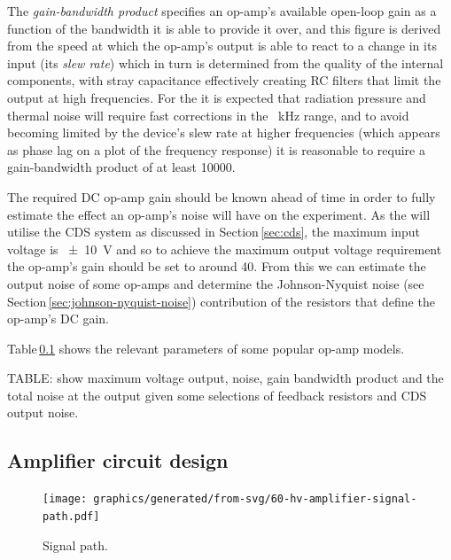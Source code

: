 The \emph{gain-bandwidth product} specifies an op-amp's available open-loop gain as a function of the bandwidth it is able to provide it over, and this figure is derived from the speed at which the op-amp's output is able to react to a change in its input (its \emph{slew rate}) which in turn is determined from the quality of the internal components, with stray capacitance effectively creating \gls{RC} filters that limit the output at high frequencies. For the \SSMEXPT{} it is expected that radiation pressure and thermal noise will require fast corrections in the \SI{}{\kilo\hertz} range, and to avoid becoming limited by the device's slew rate at higher frequencies (which appears as phase lag on a plot of the frequency response) it is reasonable to require a gain-bandwidth product of at least \num{10000}.

The required \gls{DC} op-amp gain should be known ahead of time in order to fully estimate the effect an op-amp's noise will have on the experiment. As the \SSMEXPT{} will utilise the \gls{CDS} system as discussed in Section\,\ref{sec:cds}, the maximum input voltage is \SI{\pm10}{\volt} and so to achieve the maximum output voltage requirement the op-amp's gain should be set to around \num{40}. From this we can estimate the output noise of some op-amps and determine the Johnson-Nyquist noise (see Section\,\ref{sec:johnson-nyquist-noise}) contribution of the resistors that define the op-amp's \gls{DC} gain.

Table\,\ref{} shows the relevant parameters of some popular op-amp models.

TABLE: show maximum voltage output, noise, gain bandwidth product and the total noise at the output given some selections of feedback resistors and CDS output noise.

\subsection{Amplifier circuit design}

\begin{figure}
  \centering
  \texttt{[image: graphics/generated/from-svg/60-hv-amplifier-signal-path.pdf]}
  \caption[High voltage amplifier signal schematic]{\label{fig:hv-amp-signal-path}Signal path. }
\end{figure}

